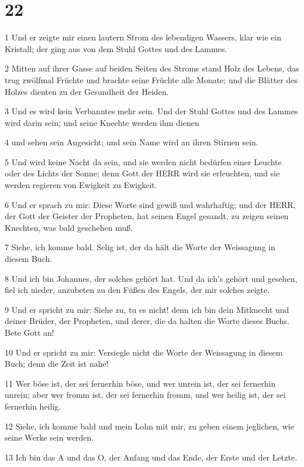 \chapter{22}

\par 1 Und er zeigte mir einen lautern Strom des lebendigen Wassers, klar wie ein Kristall; der ging aus von dem Stuhl Gottes und des Lammes.
\par 2 Mitten auf ihrer Gasse auf beiden Seiten des Stroms stand Holz des Lebens, das trug zwölfmal Früchte und brachte seine Früchte alle Monate; und die Blätter des Holzes dienten zu der Gesundheit der Heiden.
\par 3 Und es wird kein Verbanntes mehr sein. Und der Stuhl Gottes und des Lammes wird darin sein; und seine Knechte werden ihm dienen
\par 4 und sehen sein Angesicht; und sein Name wird an ihren Stirnen sein.
\par 5 Und wird keine Nacht da sein, und sie werden nicht bedürfen einer Leuchte oder des Lichts der Sonne; denn Gott der HERR wird sie erleuchten, und sie werden regieren von Ewigkeit zu Ewigkeit.
\par 6 Und er sprach zu mir: Diese Worte sind gewiß und wahrhaftig; und der HERR, der Gott der Geister der Propheten, hat seinen Engel gesandt, zu zeigen seinen Knechten, was bald geschehen muß.
\par 7 Siehe, ich komme bald. Selig ist, der da hält die Worte der Weissagung in diesem Buch.
\par 8 Und ich bin Johannes, der solches gehört hat. Und da ich's gehört und gesehen, fiel ich nieder, anzubeten zu den Füßen des Engels, der mir solches zeigte.
\par 9 Und er spricht zu mir: Siehe zu, tu es nicht! denn ich bin dein Mitknecht und deiner Brüder, der Propheten, und derer, die da halten die Worte dieses Buchs. Bete Gott an!
\par 10 Und er spricht zu mir: Versiegle nicht die Worte der Weissagung in diesem Buch; denn die Zeit ist nahe!
\par 11 Wer böse ist, der sei fernerhin böse, und wer unrein ist, der sei fernerhin unrein; aber wer fromm ist, der sei fernerhin fromm, und wer heilig ist, der sei fernerhin heilig.
\par 12 Siehe, ich komme bald und mein Lohn mit mir, zu geben einem jeglichen, wie seine Werke sein werden.
\par 13 Ich bin das A und das O, der Anfang und das Ende, der Erste und der Letzte.
